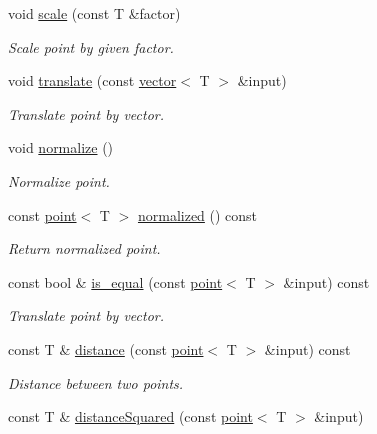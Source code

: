 \begin{DoxyCompactItemize}
void \hyperlink{classddd_1_1point_a5edb11d18e78ff66bc7aa2a5f26b8aa4}{scale} (const T \&factor)
\begin{DoxyCompactList}\small\item\em Scale point by given factor. \end{DoxyCompactList}\item 
void \hyperlink{classddd_1_1point_a36c06fef72376a058c663dd9632ddcd0}{translate} (const \hyperlink{classddd_1_1vector}{vector}$<$ T $>$ \&input)
\begin{DoxyCompactList}\small\item\em Translate point by vector. \end{DoxyCompactList}\item 
\mbox{\label{classddd_1_1point_ab1d35fc412c7e2f1661cb34f1cc2c250}} 
void \hyperlink{classddd_1_1point_ab1d35fc412c7e2f1661cb34f1cc2c250}{normalize} ()
\begin{DoxyCompactList}\small\item\em Normalize point. \end{DoxyCompactList}\item 
\mbox{\label{classddd_1_1point_ac17331c629f79d5abd4b48d807967470}} 
const \hyperlink{classddd_1_1point}{point}$<$ T $>$ \hyperlink{classddd_1_1point_ac17331c629f79d5abd4b48d807967470}{normalized} () const
\begin{DoxyCompactList}\small\item\em Return normalized point. \end{DoxyCompactList}\item 
const bool \& \hyperlink{classddd_1_1point_ac18ef1f91134bce9bcfe8d8419ab0f2b}{is\+\_\+equal} (const \hyperlink{classddd_1_1point}{point}$<$ T $>$ \&input) const
\begin{DoxyCompactList}\small\item\em Translate point by vector. \end{DoxyCompactList}\item 
const T \& \hyperlink{classddd_1_1point_a36798ea778572d6145a709e7baf7893f}{distance} (const \hyperlink{classddd_1_1point}{point}$<$ T $>$ \&input) const
\begin{DoxyCompactList}\small\item\em Distance between two points. \end{DoxyCompactList}\item 
const T \& \hyperlink{classddd_1_1point_a58ef7bc4870110dfd05c00609357756c}{distance\+Squared} (const \hyperlink{classddd_1_1point}{point}$<$ T $>$ \&input)

\end{DoxyCompactItemize}
